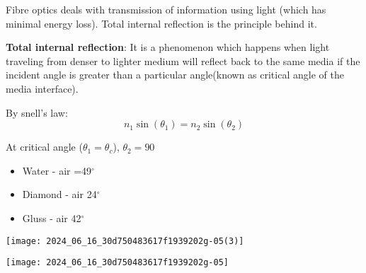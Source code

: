 \documentclass[12pt, a4paper]{article}
\begin{document}

Fibre optics deals with transmission of information using light (which has minimal energy loss). Total internal reflection is the principle behind it.

\textbf{Total internal reflection}: It is a phenomenon which happens when light traveling from denser to lighter medium will reflect back to the same media if the incident angle is greater than a particular angle(known as  critical angle of the media interface).

\begin{minipage}[t][][b]{.57\textwidth}%
	By snell's law:
	$$
		n_{1} \sin \left(\theta_{1}\right)=n_{2} \sin \left(\theta_{2}\right)
	$$

	At critical angle ($\theta_1 = \theta_c$), $\theta_{2}=90$
	\vspace{-.5cm}

	\begin{itemize}
		\item Water - air =49$^{\circ}$
		\item Diamond - air 24$^{\circ}$
		\item Gluss - air 42$^{\circ}$
	\end{itemize}
\end{minipage}%
\begin{minipage}[t][][b]{.4\textwidth}%
	\texttt{[image: 2024\_06\_16\_30d750483617f1939202g-05(3)]}

	\texttt{[image: 2024\_06\_16\_30d750483617f1939202g-05]}
\end{minipage}
\end{document}
